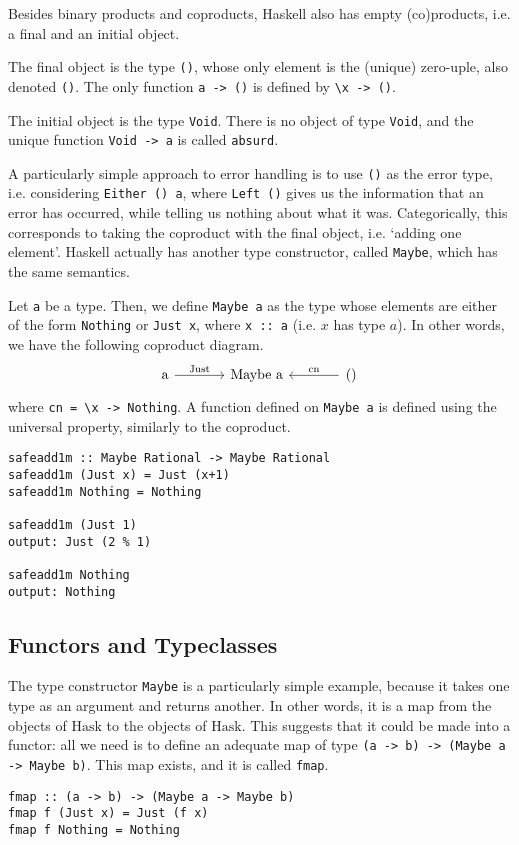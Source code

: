 \documentclass[11pt]{article}
\theoremstyle{nonumberplain}
\newcommand{\Hask}{\mathrm{Hask}}
\newcommand*\lsin{\lstinline}
\newcommand*\lsmath[1]{\text{\lstinline|#1|}}
\begin{document}
Besides binary products and coproducts, Haskell also has empty (co)products, i.e. a final and an initial object.

The final object is the type \lsin|()|, whose only element is the (unique) zero-uple, also denoted \lsin|()|. The only function \lsin|a -> ()| is defined by \lsin|\x -> ()|.

The initial object is the type \lsin|Void|. There is no object of type \lsin|Void|, and the unique function \lsin|Void -> a| is called \lsin|absurd|.

A particularly simple approach to error handling is to use \lsin|()| as the error type, i.e. considering \lsin|Either () a|, where \lsin|Left ()| gives us the information that an error has occurred, while telling us nothing about what it was. Categorically, this corresponds to taking the coproduct with the final object, i.e. `adding one element'. Haskell actually has another type constructor, called \lsin|Maybe|, which has the same semantics.

Let \lsin|a| be a type. Then, we define \lsin|Maybe a| as the type whose elements are either of the form \lsin|Nothing| or \lsin|Just x|, where \lsin|x :: a| (i.e. $x$ has type $a$). In other words, we have the following coproduct diagram.
\begin{equation}
\begin{tikzcd}[column sep = large]
\lsmath{a} \arrow[r, "\lsmath{Just}"] & \lsmath{Maybe a} & \lsmath{()} \arrow[l, "\lsmath{cn}"']
\end{tikzcd}
\end{equation}
where \lsin|cn = \x -> Nothing|. A function defined on \lsin|Maybe a| is defined using the universal property, similarly to the coproduct.
\begin{lstlisting}
safeadd1m :: Maybe Rational -> Maybe Rational
safeadd1m (Just x) = Just (x+1)
safeadd1m Nothing = Nothing
              
safeadd1m (Just 1)
output: Just (2 % 1)

safeadd1m Nothing
output: Nothing
\end{lstlisting}

\subsection{Functors and Typeclasses}\label{sec:functors}

The type constructor \lsin|Maybe| is a particularly simple example, because it takes one type as an argument and returns another. In other words, it is a map from the objects of $\Hask$ to the objects of $\Hask$. This suggests that it could be made into a functor: all we need is to define an adequate map of type \lsin|(a -> b) -> (Maybe a -> Maybe b)|. This map exists, and it is called \lsin|fmap|.
\begin{lstlisting}
fmap :: (a -> b) -> (Maybe a -> Maybe b)
fmap f (Just x) = Just (f x)
fmap f Nothing = Nothing
\end{lstlisting}
\end{document}
